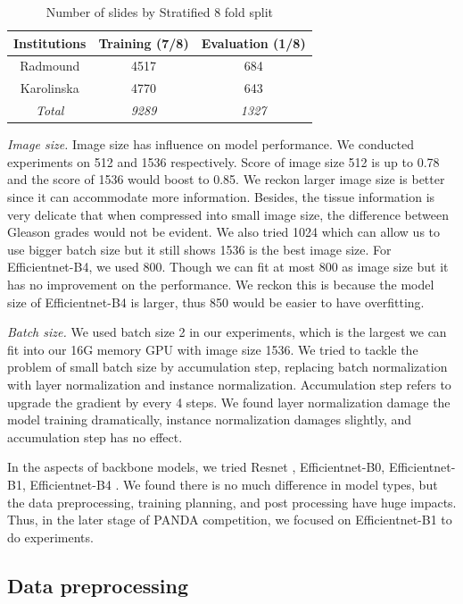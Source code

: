 \documentclass{article}
\begin{document}
\begin{table}[!htb]
\centering
\begin{tabular}{c | c | c }
Institutions & Training (7/8)  & Evaluation (1/8) \\
\toprule
Radmound &  4517 & 684 \\
Karolinska &  4770 & 643 \\
\textit{Total} & \textit{9289} & \textit{1327} \\
\bottomrule
\end{tabular}
\caption{Number of slides by Stratified 8 fold split}
\label{tab:split}
\end{table}




\textit{Image size.} Image size has influence on model performance. We conducted experiments on 512 and 1536 respectively. Score of image size 512 is up to 0.78 and the score of 1536 would boost to 0.85. We reckon larger image size is better since it can accommodate more information. Besides, the tissue information is very delicate that when compressed into small image size, the difference between Gleason grades would not be evident. We also tried 1024 which can allow us to use bigger batch size but it still shows 1536 is the best image size. For Efficientnet-B4, we used 800. Though we can fit at most 800 as image size but it has no improvement on the performance. We reckon this is because the model size of Efficientnet-B4 is larger, thus 850 would be easier to have overfitting. 

\textit{Batch size.} We used batch size 2 in our experiments, which is the largest we can fit into our 16G memory GPU with image size 1536. We tried to tackle the problem of small batch size by accumulation step, replacing batch normalization with layer normalization and instance normalization. Accumulation step refers to upgrade the gradient by every 4 steps. We found layer normalization damage the model training dramatically, instance normalization damages slightly, and accumulation step has no effect. 

In the aspects of backbone models, we tried Resnet \citep{he2016deep}, Efficientnet-B0, Efficientnet-B1, Efficientnet-B4 \citep{tan2019efficientnet}. We found there is no much difference in model types, but the data preprocessing, training planning, and post processing have huge impacts. Thus, in the later stage of PANDA competition, we focused on Efficientnet-B1 to do experiments. 


\subsection{Data preprocessing}
\end{document}
